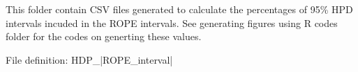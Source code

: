 This folder contain CSV files generated to calculate the percentages of 95\% HPD intervals incuded in the ROPE intervals. See generating figures using R codes folder for the codes on generting these values. 


File definition:
HDP_{|ROPE_interval|}
